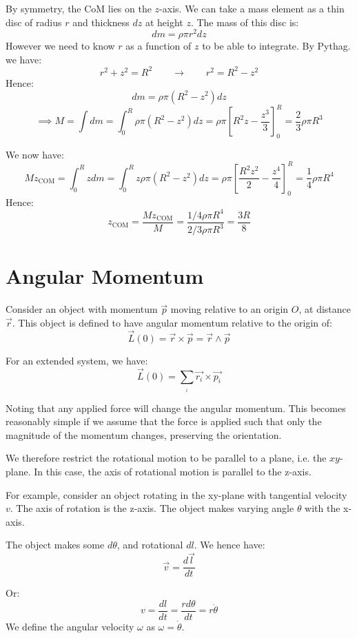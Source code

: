 By symmetry, the CoM lies on the $z$-axis. We can take a mass element as a thin disc of radius $r$ and thickness $dz$ at height $z$. The mass of this disc is:
\[
    dm = \rho \pi r^2 dz
\]
However we need to know $r$ as a function of $z$ to be able to integrate. By Pythag. we have:
\[
    r^2 + z^2 = R^2 \qquad \to \qquad r^2 = R^2 - z^2
\]
Hence:
\[
    dm = \rho \pi (R^2 - z^2) dz
\]
\[
    \implies M = \int dm = \int_0^R \rho \pi (R^2 - z^2) dz = \rho \pi \left[R^2 z - \frac{z^3}{3}\right]_0^R = \frac{2}{3} \rho \pi R^3
\]

We now have:
\[
    M z_\text{COM} = \int_0^R z dm = \int_0^R z \rho \pi (R^2 - z^2) dz = \rho \pi \left[\frac{R^2 z^2}{2} - \frac{z^4}{4}\right]_0^R = \frac{1}{4} \rho \pi R^4
\]
Hence:
\[
    z_\text{COM} = \frac{M z_\text{COM}}{M} = \frac{1/4 \rho \pi R^4}{2/3 \rho \pi R^3} = \frac{3R}{8}
\]

\section{Angular Momentum}
Consider an object with momentum $\vec{p}$ moving relative to an origin $O$, at distance $\vec{r}$. This object is defined to have angular momentum relative to the origin of:
\[
    \vec{L}(0) = \vec{r} \times \vec{p} = \vec{r} \wedge \vec{p}
\]

For an extended system, we have:
\[
    \vec{L}(0) = \sum_{_i} \vec{r_i} \times \vec{p_i}
\]

Noting that any applied force will change the angular momentum. This becomes reasonably simple if we assume that the force is applied such that only the magnitude of the momentum changes, preserving the orientation. 

We therefore restrict the rotational motion to be parallel to a plane, i.e. the $xy$-plane. In this case, the axis of rotational motion is parallel to the z-axis.

For example, consider an object rotating in the xy-plane with tangential velocity $v$. The axis of rotation is the z-axis. The object makes varying angle $\theta$ with the x-axis. 

The object makes some $d \theta$, and rotational $dl$. We hence have:
\[
    \vec{v} = \frac{d \vec{l}}{dt}
\]

Or:
\[
    v = \frac{dl}{dt} = \frac{rd \theta}{dt} = r \dot{\theta}
\]
We define the angular velocity $\omega$ as $\omega = \dot{\theta}$.

